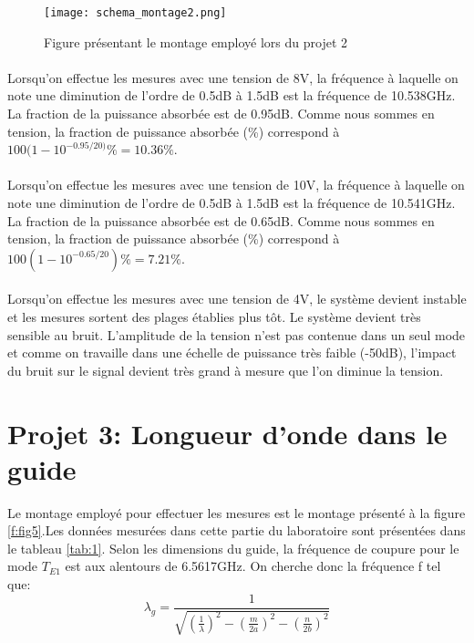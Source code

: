 \begin{figure}
\centering
\texttt{[image: schema\_montage2.png]}
\caption{Figure présentant le montage employé lors du projet 2}
\label{f:fig4}
\end{figure}


\paragraph{}Lorsqu'on effectue les mesures avec une tension de 8V, la fréquence à laquelle on note une diminution de l'ordre de 0.5dB à 1.5dB est la fréquence de 10.538GHz. La fraction de la puissance absorbée est de 0.95dB. Comme nous sommes en tension, la fraction de puissance absorbée (\%) correspond à  $100(1- 10^{-0.95/20)}\% = 10.36\%$.

\paragraph{}Lorsqu'on effectue les mesures avec une tension de 10V, la fréquence à laquelle on note une diminution de l'ordre de 0.5dB à 1.5dB est la fréquence de 10.541GHz. La fraction de la puissance absorbée est de 0.65dB. Comme nous sommes en tension, la fraction de puissance absorbée (\%) correspond à  $100(1- 10^{-0.65/20})\% = 7.21\%$.

\paragraph{}Lorsqu'on effectue les mesures avec une tension de 4V, le système devient instable et les mesures sortent des plages établies plus tôt. Le système devient très sensible au bruit. L'amplitude de la tension n'est pas contenue dans un seul mode et comme on travaille dans une échelle de puissance très faible (-50dB), l'impact du bruit sur le signal devient très grand à mesure que l'on diminue la tension.


\section{Projet 3: Longueur d'onde dans le guide}
Le montage employé pour effectuer les mesures est le montage présenté à la figure \ref{f:fig5}.Les données mesurées dans cette partie du laboratoire sont présentées dans le tableau \ref{tab:1}. Selon les dimensions du guide, la fréquence de coupure pour le mode $T_{E1}$ est aux alentours de 6.5617GHz. On cherche donc la fréquence f tel que:
\begin{equation}
\lambda_g = \frac{1}{\sqrt{\left(\frac{1}{\lambda}\right)^2 - \left( \frac{m}{2a}\right)^2  - \left( \frac{n}{2b}\right)^2}}
\end{equation}

